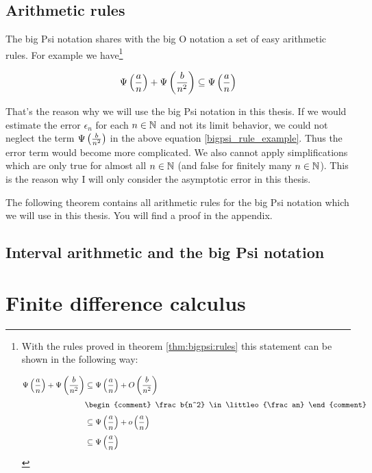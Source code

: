 \subsection{Arithmetic rules}

The big Psi notation shares with the big O notation a set of easy arithmetic rules. For example we have\footnote{With the rules proved in theorem \ref{thm:bigpsi:rules} this statement can be shown in the following way:

  \begin{align}
    \bigpsi{\frac an}+\bigpsi{\frac{b}{n^2}} & \subseteq \bigpsi{\frac an} + \bigo{\frac b{n^2}} \nl
    & \begin{comment}
      \frac b{n^2} \in \littleo{\frac an}
    \end{comment} \nl
    & \subseteq \bigpsi{\frac an} + \littleo{\frac an} \nl
    & \subseteq \bigpsi{\frac an}
  \end{align}
}

\begin{align} \label{bigpsi_rule_example}
  \Psi\left( {\frac an} \right)+\Psi\left( {\frac b{n^2}} \right) \subseteq \Psi\left( {\frac an} \right)
\end{align}

That's the reason why we will use the big Psi notation in this thesis. If we would estimate the error $\epsilon_n$ for each $n\in\mathbb N$ and not its limit behavior, we could not neglect the term $\Psi\left( {\frac b{n^2}} \right)$ in the above equation \eqref{bigpsi_rule_example}. Thus the error term would become more complicated. We also cannot apply simplifications which are only true for almost all $n\in\mathbb N$ (and false for finitely many $n\in\mathbb N$). This is the reason why I will only consider the asymptotic error in this thesis.

The following theorem contains all arithmetic rules for the big Psi notation which we will use in this thesis. You will find a proof in the appendix.



\subsection{Interval arithmetic and the big Psi notation}

\section{Finite difference calculus}

